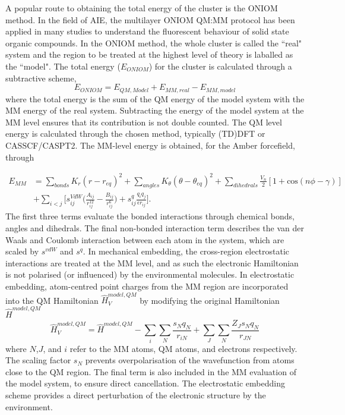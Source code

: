 A popular route to obtaining the total energy of the cluster is the ONIOM method.\cite{Byun1999,Frisch2003,Chung2015a} In the field of \ac{AIE}, the multilayer ONIOM QM:MM protocol has been applied in many studies to understand the fluorescent behaviour of solid state organic compounds.\cite{Li2011,Li2013,Sun2015a,Presti2016a,Wilbraham2016,Wang2016,Peng2016,Fan2016,Presti2017a,Li2017b,Lin2017,Li2017e,Fan2017,Hestand2017} In the ONIOM method, the whole cluster is called the ``real" system and the region to be treated at the highest level of theory is laballed as the ``model". The total energy ($E_{ONIOM}$) for the cluster is calculated through a subtractive scheme,
\begin{equation}\label{equation: ONIOM}
E_{ONIOM}=E_{QM,Model}+E_{MM,real}-E_{MM,model}
\end{equation}
where the total energy is the sum of the QM energy of the model system with the MM energy of the real system. Subtracting the energy of the model system at the MM level ensures that its contribution is not double counted.\cite{Chung2015a} The QM level energy is calculated through the chosen method, typically (TD)DFT or CASSCF/CASPT2. The MM-level energy is obtained, for the Amber forcefield, through

\begin{equation}
\begin{split}
    E_{MM}&=\sum_{bonds}K_{r}(r-r_{eq})^{2}+\sum_{angles}K_{\theta}(\theta-\theta_{eq})^{2}+\sum_{dihedrals}\frac{V_{n}}{2}[1+\mathrm{cos}(n\phi{}-\gamma{})]\\
    &+\sum_{i<j}\bigg[s_{ij}^{VdW}\big(\frac{A_{ij}}{r_{ij}^{12}}-\frac{B_{ij}}{r_{ij}^{6}}\big)+s^{q}_{ij}\frac{q_{i}q_{j}}{\epsilon{}r_{ij}}\bigg].
\end{split}
\end{equation}
The first three terms evaluate the bonded interactions through chemical bonds, angles and dihedrals. The final non-bonded interaction term describes the van der Waals and Coulomb interaction between each atom in the system, which are scaled by $s^{vdW}$ and $s^{q}$.
In mechanical embedding, the cross-region electrostatic interactions are treated at the MM level, and as such the electronic Hamiltonian is not polarised (or influenced) by the environmental molecules. In electrostatic embedding, atom-centred point charges from the MM region are incorporated into the QM Hamiltonian $\hat{H}_{V}^{model,QM}$ by modifying the original Hamiltonian $\hat{H}^{model,QM}$
\begin{equation}
    \hat{H}_{V}^{model,QM}=\hat{H}^{model,QM}-\sum_{i}\sum_{N}\frac{s_{N}q_{N}}{r_{iN}}+\sum_{J}\sum_{N}\frac{Z_{J}s_{N}q_{N}}{r_{JN}}
\end{equation}
where $N$,$J$, and $i$ refer to the MM atoms, QM atoms, and electrons respectively.\cite{Vreven2006} The scaling factor $s_{N}$ prevents overpolarisation of the wavefunction from atoms close to the QM region. The final term is also included in the MM evaluation of the model system, to ensure direct cancellation. The electrostatic embedding scheme provides a direct perturbation of the electronic structure by the environment. 

